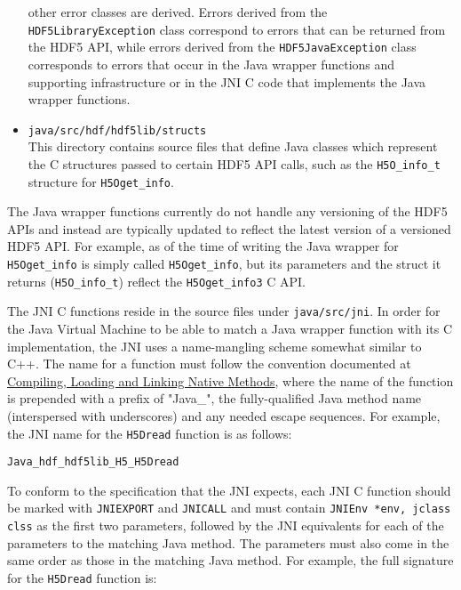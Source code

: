 \begin{itemize}
    other error classes are derived. Errors derived from the \texttt{HDF5LibraryException} class
    correspond to errors that can be returned from the HDF5 API, while errors derived from the
    \texttt{HDF5JavaException} class corresponds to errors that occur in the Java wrapper functions
    and supporting infrastructure or in the JNI C code that implements the Java wrapper functions.
  \item \texttt{java/src/hdf/hdf5lib/structs} \\
    This directory contains source files that define Java classes which represent the C structures
    passed to certain HDF5 API calls, such as the \texttt{H5O\_info\_t} structure for \texttt{H5Oget\_info}.
\end{itemize}

The Java wrapper functions currently do not handle any versioning of the HDF5 APIs and instead
are typically updated to reflect the latest version of a versioned HDF5 API. For example, as of
the time of writing the Java wrapper for \texttt{H5Oget\_info} is simply called \texttt{H5Oget\_info},
but its parameters and the struct it returns (\texttt{H5O\_info\_t}) reflect the \texttt{H5Oget\_info3}
C API.

The JNI C functions reside in the source files under \texttt{java/src/jni}. In order for the
Java Virtual Machine to be able to match a Java wrapper function with its C implementation, the
JNI uses a name-mangling scheme somewhat similar to C++. The name for a function must follow
the convention documented at \href{https://docs.oracle.com/en/java/javase/17/docs/specs/jni/design.html#compiling-loading-and-linking-native-methods}{Compiling, Loading and Linking Native Methods},
where the name of the function is prepended with a prefix of "Java\_", the fully-qualified Java method
name (interspersed with underscores) and any needed escape sequences. For example, the JNI name for
the \texttt{H5Dread} function is as follows:

\begin{verbatim}
Java_hdf_hdf5lib_H5_H5Dread
\end{verbatim}

To conform to the specification that the JNI expects, each JNI C function should be marked with
\texttt{JNIEXPORT} and \texttt{JNICALL} and must contain \texttt{JNIEnv *env, jclass clss} as the
first two parameters, followed by the JNI equivalents for each of the parameters to the matching
Java method. The parameters must also come in the same order as those in the matching Java method.
For example, the full signature for the \texttt{H5Dread} function is:

